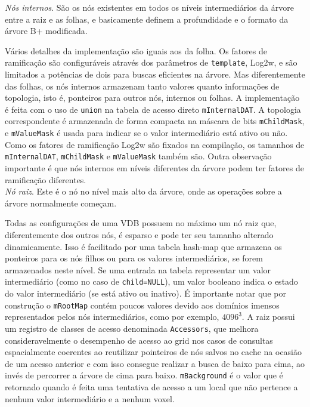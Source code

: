\documentclass[12pt, a4paper, oneside]{book}
\begin{document}
\emph{Nós internos}. São os nós existentes em todos os níveis intermediários da árvore entre a raiz e as folhas, e basicamente definem a profundidade e o formato da árvore B+ modificada.  



Vários detalhes da implementação são iguais aos da folha. Os fatores de ramificação são configuráveis através dos parâmetros de \texttt{template}, Log2w, e são limitados a potências de dois para buscas eficientes na árvore. Mas diferentemente das folhas, os nós internos armazenam tanto valores quanto informações de topologia, isto é, ponteiros para outros nós, internos ou folhas. A implementação é feita com o uso de \texttt{union} na tabela de acesso direto \texttt{mInternalDAT}. A topologia correspondente é armazenada de forma compacta na máscara de bits \texttt{mChildMask}, e \texttt{mValueMask} é usada para indicar se o valor intermediário está ativo ou não. Como os fatores de ramificação Log2w são fixados na compilação, os tamanhos de \texttt{mInternalDAT}, \texttt{mChildMask} e \texttt{mValueMask} também são. Outra observação importante é que nós internos em níveis diferentes da árvore podem ter fatores de ramificação diferentes. \\

\emph{Nó raiz}. Este é o nó no nível mais alto da árvore, onde as operações sobre a árvore normalmente começam. 



Todas as configurações de uma VDB possuem no máximo um nó raiz que, diferentemente dos outros nós, é esparso e pode ter seu tamanho alterado dinamicamente. Isso é facilitado por uma tabela hash-map que armazena os ponteiros para os nós filhos ou para os valores intermediários, se forem armazenados neste nível. Se uma entrada na tabela representar um valor intermediário (como no caso de \texttt{child=NULL}), um valor booleano indica o estado do valor intermediário (se está ativo ou inativo). É importante notar que por construção o \texttt{mRootMap} contém poucos valores devido aos domínios imensos representados pelos nós intermediários, como por exemplo, $4096^{3}$.
A raiz possui um registro de classes de acesso denominada \texttt{Accessors}, que melhora consideravelmente o desempenho de acesso ao grid nos casos de consultas espacialmente coerentes ao reutilizar pointeiros de nós salvos no cache na ocasião de um acesso anterior e com isso consegue realizar a busca de baixo para cima, ao invés de percorrer a árvore de cima para baixo. \texttt{mBackground} é o valor que é retornado quando é feita uma tentativa de acesso a um local que não pertence a nenhum valor intermediário e a nenhum voxel.
\end{document}
